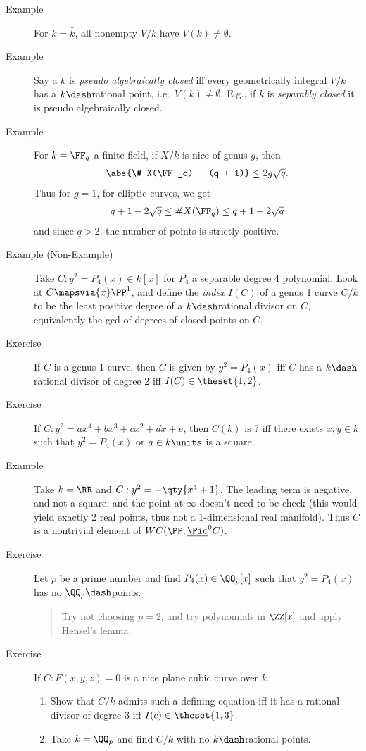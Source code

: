\begin{description}
\item[Example]
For \(k = \bar k\), all nonempty \(V/k\) have \(V(k) \neq \emptyset\).
\item[Example]
Say a \(k\) is \emph{pseudo algebraically closed} iff every
geometrically integral \(V/k\) has a \(k\dash\)rational point,
i.e.~\(V(k) \neq \emptyset\). E.g., if \(k\) is \emph{separably closed}
it is pseudo algebraically closed.
\item[Example]
For \(k = \FF_q\) a finite field, if \(X/k\) is nice of genus \(g\),
then
\begin{align*}\abs{\# X(\FF_q) - (q + 1)} \leq 2g \sqrt q.\end{align*}
Thus for \(g=1\), for elliptic curves, we get
\begin{align*}q+1 - 2\sqrt q \leq \# X(\FF_q) \leq q+1 + 2\sqrt{q}\end{align*}
and since \(q>2\), the number of points is strictly positive.
\item[Example (Non-Example)]
Take \(C: y^2 = P_4(x) \in k[x]\) for \(P_4\) a separable degree 4
polynomial. Look at \(C \mapsvia{x} \PP^1\), and define the \emph{index}
\(I(C)\) of a genus 1 curve \(C/k\) to be the least positive degree of a
\(k\dash\)rational divisor on \(C\), equivalently the gcd of degrees of
closed points on \(C\).
\item[Exercise]
If \(C\) is a genus 1 curve, then \(C\) is given by \(y^2 = P_4(x)\) iff
\(C\) has a \(k\dash\)rational divisor of degree 2 iff
\(I(C) \in \theset{1, 2}\).
\item[Exercise]
If \(C: y^2 = ax^4 + bx^3 + cx^2 + dx + e\), then \(C(k)\) is ? iff
there exists \(x, y\in k\) such that \(y^2 = P_4(x)\) or
\(a\in k\units\) is a square.
\item[Example]
Take \(k=\RR\) and \(C: y^2 = - \qty{x^4 + 1}\). The leading term is
negative, and not a square, and the point at \(\infty\) doesn't need to
be check (this would yield exactly 2 real points, thus not a
1-dimensional real manifold). Thus \(C\) is a nontrivial element of
\(WC(\PP, \underline{\Pic}^0 C)\).
\item[Exercise]
Let \(p\) be a prime number and find \(P_4(x) \in \QQ_p[x]\) such that
\(y^2 = P_4(x)\) has no \(\QQ_p\dash\)points.

\begin{quote}
Try not choosing \(p=2\), and try polynomials in \(\ZZ[x]\) and apply
Hensel's lemma.
\end{quote}
\item[Exercise]
If \(C: F(x, y,z) = 0\) is a nice plane cubic curve over \(k\)

\begin{enumerate}
\def\labelenumi{\alph{enumi}.}
\item
  Show that \(C/k\) admits such a defining equation iff it has a
  rational divisor of degree 3 iff \(I(c) \in \theset{1, 3}\).
\item
  Take \(k= \QQ_p\) and find \(C/k\) with no \(k\dash\)rational points.
\end{enumerate}
\end{description}

